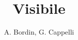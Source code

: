 \documentclass[a4paper]{article}
\author{A. Bordin, G. Cappelli}
\title{Visibile}
\date{}
\begin{document}
	\maketitle
	
	\begin{abstract}
		 
	\end{abstract}
	
\end{document}
